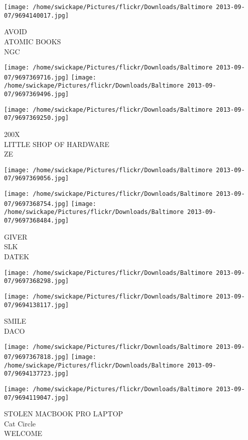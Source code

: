 \documentclass[10pt,letterpaper]{article}
\begin{document}
\vspace{0.25in}
\texttt{[image: /home/swickape/Pictures/flickr/Downloads/Baltimore 2013-09-07/9694140017.jpg]}

AVOID\\
ATOMIC BOOKS\\
NGC
\pagebreak

\texttt{[image: /home/swickape/Pictures/flickr/Downloads/Baltimore 2013-09-07/9697369716.jpg]}
\texttt{[image: /home/swickape/Pictures/flickr/Downloads/Baltimore 2013-09-07/9697369496.jpg]}

\texttt{[image: /home/swickape/Pictures/flickr/Downloads/Baltimore 2013-09-07/9697369250.jpg]}

200X\\
LITTLE SHOP OF HARDWARE\\
ZE
\pagebreak

\texttt{[image: /home/swickape/Pictures/flickr/Downloads/Baltimore 2013-09-07/9697369056.jpg]}

\vspace{0.25in}
\texttt{[image: /home/swickape/Pictures/flickr/Downloads/Baltimore 2013-09-07/9697368754.jpg]}
\texttt{[image: /home/swickape/Pictures/flickr/Downloads/Baltimore 2013-09-07/9697368484.jpg]}

GIVER\\
SLK\\
DATEK
\pagebreak

\texttt{[image: /home/swickape/Pictures/flickr/Downloads/Baltimore 2013-09-07/9697368298.jpg]}

\vspace{0.25in}
\texttt{[image: /home/swickape/Pictures/flickr/Downloads/Baltimore 2013-09-07/9694138117.jpg]}

SMILE\\
DACO
\pagebreak

\texttt{[image: /home/swickape/Pictures/flickr/Downloads/Baltimore 2013-09-07/9697367818.jpg]}
\texttt{[image: /home/swickape/Pictures/flickr/Downloads/Baltimore 2013-09-07/9694137723.jpg]}

\texttt{[image: /home/swickape/Pictures/flickr/Downloads/Baltimore 2013-09-07/9694119047.jpg]}

STOLEN MACBOOK PRO LAPTOP\\
Cat Circle\\
WELCOME
\pagebreak
\end{document}
